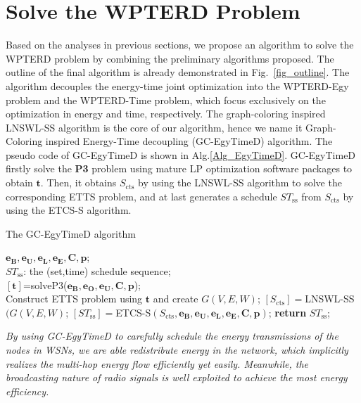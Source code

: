 \documentclass[journal,10pt]{IEEEtran}
\begin{document}
\section{Solve the WPTERD Problem}
\label{sec_algcombin}
Based on the analyses in previous sections, we propose an algorithm to solve the WPTERD problem by combining the preliminary algorithms proposed. The outline of the final algorithm is already demonstrated in Fig.~\ref{fig_outline}. The algorithm decouples the energy-time joint optimization into the WPTERD-Egy problem and the WPTERD-Time problem, which focus exclusively on the optimization in energy and time, respectively. The graph-coloring inspired LNSWL-SS algorithm is the core of our algorithm, hence we name it Graph-Coloring inspired Energy-Time decoupling (GC-EgyTimeD) algorithm. The pseudo code of GC-EgyTimeD is shown in Alg.\ref{Alg_EgyTimeD}.  GC-EgyTimeD firstly solve the \textbf{P3} problem using mature LP optimization software packages to obtain $\mathbf{t}$. Then, it obtains $S_\text{cts}$ by using the LNSWL-SS algorithm to solve the corresponding ETTS problem, and at last generates a schedule $ST_\text{ss}$ from $S_\text{cts}$ by using the ETCS-S algorithm.

\begin{algorithm}[!htb]
\caption{The GC-EgyTimeD algorithm}
\begin{algorithmic}[1]\label{Alg_EgyTimeD}
    \REQUIRE $\mathbf{e_B}, \mathbf{e_U}, \mathbf{e_L}, \mathbf{e_E}, \mathbf{C}, \mathbf{p}$;\\
    \ENSURE $ST_\text{ss}$: the (set,time) schedule sequence;\\
    \STATE $[\mathbf{t}]${=}solveP3($\mathbf{e_B}, \mathbf{e_O},\mathbf{e_U},\mathbf{C}, \mathbf{p}$);\\
    \STATE Construct ETTS problem using $\mathbf{t}$ and create $G(V,E,W)$;
    \STATE $[S_\text{cts}]{=}$LNSWL-SS$(G(V,E,W)$;
    \STATE $[ST_\text{ss}]{=}$ETCS-S$(S_\text{cts},\mathbf{e_B}, \mathbf{e_U}, \mathbf{e_L}, \mathbf{e_E}, \mathbf{C}, \mathbf{p})$;
    \STATE \textbf{return} $ST_\text{ss}$;
\end{algorithmic}
\end{algorithm}

\textit{By using GC-EgyTimeD to carefully schedule the energy transmissions of the nodes in WSNs, we are able redistribute energy in the network, which implicitly realizes the multi-hop energy flow efficiently yet easily. Meanwhile, the broadcasting nature of radio signals is well exploited to achieve the most energy efficiency.}
\end{document}
